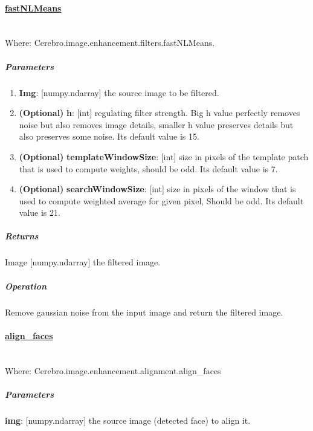  	
\paragraph{\underline{fastNLMeans}} \mbox{} \\
Where: Cerebro.image.enhancement.filters.fastNLMeans.
\subparagraph{Parameters}
\begin{changemargin}{0.5cm}{0cm}
	\begin{enumerate} 
		\item \textbf{Img}: [numpy.ndarray] the source image to be filtered.
		\item \textbf{(Optional)} \textbf{h}: [int] regulating filter strength. Big h value perfectly removes noise but also removes image details, smaller h value preserves details but also preserves some noise. Its default value is 15.
		\item \textbf{(Optional)} \textbf{templateWindowSize}: [int] size in pixels of the template patch that is used to compute weights, should be odd. \newline Its default value is 7.
		\item \textbf{(Optional)} \textbf{searchWindowSize}: [int] size in pixels of the window that is used to compute weighted average for given pixel, Should be odd. \newline Its default value is 21.
	\end{enumerate}
\end{changemargin}

\subparagraph{Returns}
\begin{changemargin}{1cm}{0cm}
	Image [numpy.ndarray] the filtered image.
\end{changemargin}

\subparagraph{Operation}
\begin{changemargin}{1cm}{0cm}
	Remove gaussian noise from the input image and return the filtered image.
\end{changemargin}

\paragraph{\underline{align\_faces}} \mbox{} \\
Where: Cerebro.image.enhancement.alignment.align\_faces
\subparagraph{Parameters}
\begin{changemargin}{1cm}{0cm}
	\textbf{img}: [numpy.ndarray] the source image (detected face) to align it.
\end{changemargin}

